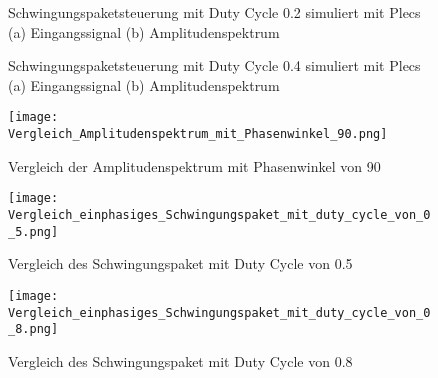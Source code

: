 \begin{appendix}
\begin{figure}[ht!]
	\centering
	\qquad
	\caption{Schwingungspaketsteuerung mit Duty Cycle 0.2 simuliert mit Plecs (a) Eingangssignal (b) Amplitudenspektrum}
	\label{fig:Schwingungspaketsteuerung_mit_duty_cycle_0_2 simuliert_mit_Plecs}
\end{figure}

\newpage

\begin{figure}[ht!]
	\centering
	\qquad
	\caption{Schwingungspaketsteuerung mit Duty Cycle 0.4 simuliert mit Plecs (a) Eingangssignal (b) Amplitudenspektrum}
	\label{fig:Schwingungspaketsteuerung_mit_duty_cycle_0_4 simuliert_mit_Plecs}
\end{figure}


\begin{figure}[ht!]
	\centering
	\texttt{[image: Vergleich\_Amplitudenspektrum\_mit\_Phasenwinkel\_90.png]}	
	\caption{Vergleich der Amplitudenspektrum mit Phasenwinkel von 90\textdegree}
	\label{fig:Vergleich_der_Amplitudenspektrum_mit Phasenwinkel_von_90}
\end{figure}

\begin{figure}[ht!]
	\centering
	\texttt{[image: Vergleich\_einphasiges\_Schwingungspaket\_mit\_duty\_cycle\_von\_0\_5.png]}	
	\caption{Vergleich des Schwingungspaket mit Duty Cycle von 0.5}
	\label{fig:Vergleich des Schwingungspaket mit Duty Cycle von 0.5}
\end{figure}

\newpage

\begin{figure}[ht!]
	\centering
	\texttt{[image: Vergleich\_einphasiges\_Schwingungspaket\_mit\_duty\_cycle\_von\_0\_8.png]}	
	\caption{Vergleich des Schwingungspaket mit Duty Cycle von 0.8}
	\label{fig:Vergleich des Schwingungspaket mit Duty Cycle von 0.8}
\end{figure}


\end{appendix}
